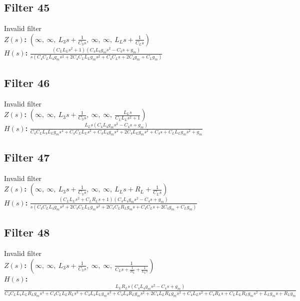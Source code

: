 \documentclass{article}
\begin{document}
\subsection*{Filter 45}
Invalid filter \\ 
\textbf{$Z(s)$:} $\left( \infty, \  \infty, \  L_{3} s + \frac{1}{C_{3} s}, \  \infty, \  \infty, \  L_{L} s + \frac{1}{C_{L} s}\right)$ \\ 
\textbf{$H(s)$:} $\frac{\left(C_{L} L_{L} s^{2} + 1\right) \left(C_{4} L_{4} g_{m} s^{2} - C_{4} s + g_{m}\right)}{s \left(C_{4} C_{L} L_{4} g_{m} s^{2} + 2 C_{4} C_{L} L_{L} g_{m} s^{2} + C_{4} C_{L} s + 2 C_{4} g_{m} + C_{L} g_{m}\right)}$ \\ 
\subsection*{Filter 46}
Invalid filter \\ 
\textbf{$Z(s)$:} $\left( \infty, \  \infty, \  L_{3} s + \frac{1}{C_{3} s}, \  \infty, \  \infty, \  \frac{L_{L} s}{C_{L} L_{L} s^{2} + 1}\right)$ \\ 
\textbf{$H(s)$:} $\frac{L_{L} s \left(C_{4} L_{4} g_{m} s^{2} - C_{4} s + g_{m}\right)}{C_{4} C_{L} L_{4} L_{L} g_{m} s^{4} + C_{4} C_{L} L_{L} s^{3} + C_{4} L_{4} g_{m} s^{2} + 2 C_{4} L_{L} g_{m} s^{2} + C_{4} s + C_{L} L_{L} g_{m} s^{2} + g_{m}}$ \\ 
\subsection*{Filter 47}
Invalid filter \\ 
\textbf{$Z(s)$:} $\left( \infty, \  \infty, \  L_{3} s + \frac{1}{C_{3} s}, \  \infty, \  \infty, \  L_{L} s + R_{L} + \frac{1}{C_{L} s}\right)$ \\ 
\textbf{$H(s)$:} $\frac{\left(C_{L} L_{L} s^{2} + C_{L} R_{L} s + 1\right) \left(C_{4} L_{4} g_{m} s^{2} - C_{4} s + g_{m}\right)}{s \left(C_{4} C_{L} L_{4} g_{m} s^{2} + 2 C_{4} C_{L} L_{L} g_{m} s^{2} + 2 C_{4} C_{L} R_{L} g_{m} s + C_{4} C_{L} s + 2 C_{4} g_{m} + C_{L} g_{m}\right)}$ \\ 
\subsection*{Filter 48}
Invalid filter \\ 
\textbf{$Z(s)$:} $\left( \infty, \  \infty, \  L_{3} s + \frac{1}{C_{3} s}, \  \infty, \  \infty, \  \frac{1}{C_{L} s + \frac{1}{R_{L}} + \frac{1}{L_{L} s}}\right)$ \\ 
\textbf{$H(s)$:} $\frac{L_{L} R_{L} s \left(C_{4} L_{4} g_{m} s^{2} - C_{4} s + g_{m}\right)}{C_{4} C_{L} L_{4} L_{L} R_{L} g_{m} s^{4} + C_{4} C_{L} L_{L} R_{L} s^{3} + C_{4} L_{4} L_{L} g_{m} s^{3} + C_{4} L_{4} R_{L} g_{m} s^{2} + 2 C_{4} L_{L} R_{L} g_{m} s^{2} + C_{4} L_{L} s^{2} + C_{4} R_{L} s + C_{L} L_{L} R_{L} g_{m} s^{2} + L_{L} g_{m} s + R_{L} g_{m}}$ \\ 
\end{document}
